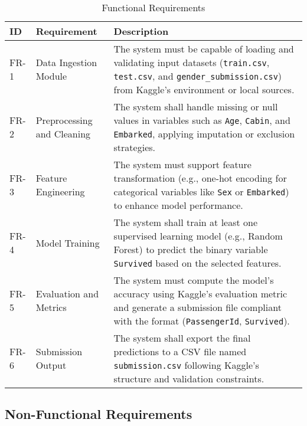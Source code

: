 \documentclass[12pt]{report}
\begin{document}
\begin{table}[H]
\centering
\begin{tabular}{|p{1cm}|p{4cm}|p{9cm}|}
\hline
\textbf{ID} & \textbf{Requirement} & \textbf{Description} \\ \hline
FR-1 & Data Ingestion Module & The system must be capable of loading and validating input datasets (\texttt{train.csv}, \texttt{test.csv}, and \texttt{gender\_submission.csv}) from Kaggle’s environment or local sources. \\ \hline
FR-2 & Preprocessing and Cleaning & The system shall handle missing or null values in variables such as \texttt{Age}, \texttt{Cabin}, and \texttt{Embarked}, applying imputation or exclusion strategies. \\ \hline
FR-3 & Feature Engineering & The system must support feature transformation (e.g., one-hot encoding for categorical variables like \texttt{Sex} or \texttt{Embarked}) to enhance model performance. \\ \hline
FR-4 & Model Training & The system shall train at least one supervised learning model (e.g., Random Forest) to predict the binary variable \texttt{Survived} based on the selected features. \\ \hline
FR-5 & Evaluation and Metrics & The system must compute the model’s accuracy using Kaggle’s evaluation metric and generate a submission file compliant with the format (\texttt{PassengerId}, \texttt{Survived}). \\ \hline
FR-6 & Submission Output & The system shall export the final predictions to a CSV file named \texttt{submission.csv} following Kaggle’s structure and validation constraints. \\ \hline
\end{tabular}
\caption{Functional Requirements}
\end{table}

\subsection{Non-Functional Requirements}
\end{document}

